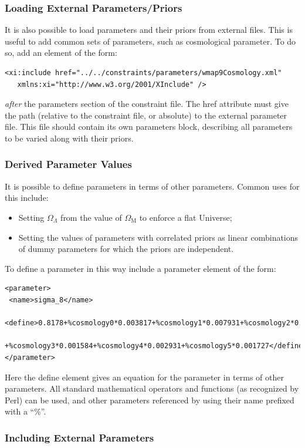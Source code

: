 \subsubsection{Loading External Parameters/Priors}

It is also possible to load parameters and their priors from external files. This is useful to add common sets of parameters, such as cosmological parameter. To do so, add an element of the form:
\begin{verbatim}
<xi:include href="../../constraints/parameters/wmap9Cosmology.xml" 
   xmlns:xi="http://www.w3.org/2001/XInclude" />
\end{verbatim}
\emph{after} the {\normalfont \ttfamily parameters} section of the constraint file. The {\normalfont \ttfamily href} attribute must give the path (relative to the constraint file, or absolute) to the external parameter file. This file should contain its own {\normalfont \ttfamily parameters} block, describing all parameters to be varied along with their priors. 

\subsubsection{Derived Parameter Values}

It is possible to define parameters in terms of other parameters. Common uses for this include:
\begin{itemize}
 \item Setting $\Omega_\Lambda$ from the value of $\Omega_{\mathrm M}$ to enforce a flat Universe;
 \item Setting the values of parameters with correlated priors as linear combinations of dummy parameters for which the priors are independent.
\end{itemize}
To define a parameter in this way include a {\normalfont \ttfamily parameter} element of the form:
\begin{verbatim}
<parameter>
 <name>sigma_8</name>
 <define>0.8178+%cosmology0*0.003817+%cosmology1*0.007931+%cosmology2*0.01002
    +%cosmology3*0.001584+%cosmology4*0.002931+%cosmology5*0.001727</define>
</parameter>
\end{verbatim}
Here the {\normalfont \ttfamily define} element gives an equation for the parameter in terms of other parameters. All standard mathematical operators and functions (as recognized by Perl) can be used, and other parameters referenced by using their name prefixed with a ``\%''.

\subsubsection{Including External Parameters}

